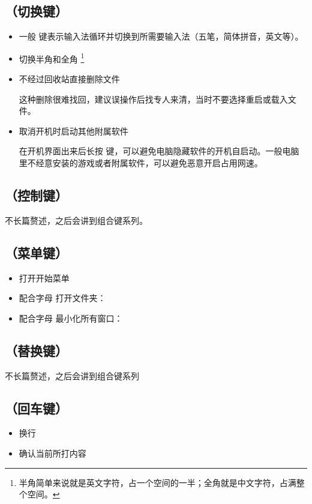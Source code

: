 \subsection{ （切换键）}
\begin{itemize}
	\item 一般  键表示输入法循环并切换到所需要输入法（五笔，简体拼音，英文等）。
	\item 切换半角和全角%
	\footnote{半角简单来说就是英文字符，占一个空间的一半；全角就是中文字符，占满整个空间。}
	\item {} 不经过回收站直接删除文件
	
	这种删除很难找回，建议误操作后找专人来清，当时不要选择重启或载入文件。
	\item 取消开机时启动其他附属软件
	
	在开机界面出来后长按  键，可以避免电脑隐藏软件的开机自启动。一般电脑里不经意安装的游戏或者附属软件，可以避免恶意开启占用网速。
\end{itemize}
\subsection{ （控制键）}
不长篇赘述，之后会讲到组合键系列。
\subsection{ （菜单键）}
\begin{itemize}
	\item 打开开始菜单
	\item 配合字母  打开文件夹：
	\item 配合字母  最小化所有窗口：
\end{itemize}
\subsection{ （替换键）}
不长篇赘述，之后会讲到组合键系列
\subsection{ （回车键）}
\begin{itemize}
	\item 换行
	\item 确认当前所打内容
\end{itemize}